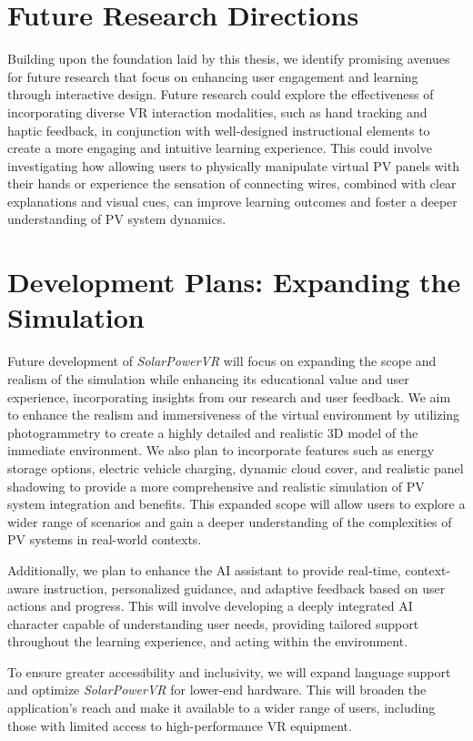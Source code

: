 \documentclass[draft, final]{vutinfth} %
\begin{document}
\section{Future Research Directions}

Building upon the foundation laid by this thesis, we identify promising avenues for future research that focus on enhancing user engagement and learning through interactive design. Future research could explore the effectiveness of incorporating diverse VR interaction modalities, such as hand tracking and haptic feedback, in conjunction with well-designed instructional elements to create a more engaging and intuitive learning experience. This could involve investigating how allowing users to physically manipulate virtual PV panels with their hands or experience the sensation of connecting wires, combined with clear explanations and visual cues, can improve learning outcomes and foster a deeper understanding of PV system dynamics.

\section{Development Plans: Expanding the Simulation}

Future development of \textit{SolarPowerVR} will focus on expanding the scope and realism of the simulation while enhancing its educational value and user experience, incorporating insights from our research and user feedback.  We aim to enhance the realism and immersiveness of the virtual environment by utilizing photogrammetry to create a highly detailed and realistic 3D model of the immediate environment. We also plan to incorporate features such as energy storage options, electric vehicle charging, dynamic cloud cover, and realistic panel shadowing to provide a more comprehensive and realistic simulation of PV system integration and benefits. This expanded scope will allow users to explore a wider range of scenarios and gain a deeper understanding of the complexities of PV systems in real-world contexts. 

Additionally, we plan to enhance the AI assistant to provide real-time, context-aware instruction, personalized guidance, and adaptive feedback based on user actions and progress. This will involve developing a deeply integrated AI character capable of understanding user needs, providing tailored support throughout the learning experience, and acting within the environment. 

To ensure greater accessibility and inclusivity, we will expand language support and optimize \textit{SolarPowerVR} for lower-end hardware. This will broaden the application's reach and make it available to a wider range of users, including those with limited access to high-performance VR equipment.
\end{document}
